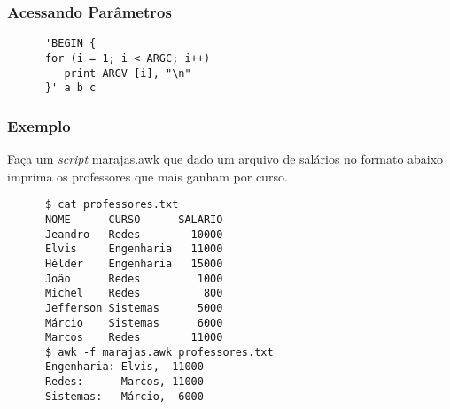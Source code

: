 \documentclass{beamer}
\begin{document}
   \begin{frame}[fragile]
      \frametitle{Acessando Parâmetros}
      \begin{verbatim}
      'BEGIN {
      for (i = 1; i < ARGC; i++)
         print ARGV [i], "\n"
      }' a b c
      \end{verbatim}
\end{frame}

\begin{frame}[fragile]
      \frametitle{Exemplo}
      Faça um \textit{script} marajas.awk que dado um arquivo de salários no formato abaixo imprima os professores que mais ganham por curso.
      \begin{verbatim}
      $ cat professores.txt
      NOME      CURSO      SALARIO
      Jeandro   Redes        10000
      Elvis     Engenharia   11000
      Hélder    Engenharia   15000
      João      Redes         1000
      Michel    Redes          800
      Jefferson Sistemas      5000
      Márcio    Sistemas      6000
      Marcos    Redes        11000
      $ awk -f marajas.awk professores.txt
      Engenharia: Elvis,  11000
      Redes:      Marcos, 11000
      Sistemas:   Márcio,  6000
      \end{verbatim}
\end{frame}

%
%
\end{document}
